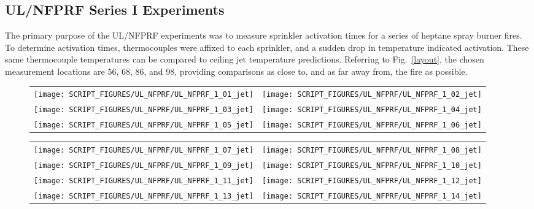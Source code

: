 \clearpage

\subsection{UL/NFPRF Series I Experiments}

The primary purpose of the UL/NFPRF experiments was to measure sprinkler activation times for a series of heptane spray burner fires. To determine activation times, thermocouples were affixed to each sprinkler, and a sudden drop in temperature indicated activation. These same thermocouple temperatures can be compared to ceiling jet temperature predictions. Referring to Fig.~\ref{layout}, the chosen measurement locations are 56, 68, 86, and 98, providing comparisons as close to, and as far away from, the fire as possible.


\begin{figure}[h!]
\begin{tabular*}{\textwidth}{l@{\extracolsep{\fill}}r}
\texttt{[image: SCRIPT\_FIGURES/UL\_NFPRF/UL\_NFPRF\_1\_01\_jet]} &
\texttt{[image: SCRIPT\_FIGURES/UL\_NFPRF/UL\_NFPRF\_1\_02\_jet]} \\
\texttt{[image: SCRIPT\_FIGURES/UL\_NFPRF/UL\_NFPRF\_1\_03\_jet]} &
\texttt{[image: SCRIPT\_FIGURES/UL\_NFPRF/UL\_NFPRF\_1\_04\_jet]} \\
\texttt{[image: SCRIPT\_FIGURES/UL\_NFPRF/UL\_NFPRF\_1\_05\_jet]} &
\texttt{[image: SCRIPT\_FIGURES/UL\_NFPRF/UL\_NFPRF\_1\_06\_jet]}
\end{tabular*}
\label{UL_NFPRF_jet_1}
\end{figure}

\newpage

\begin{figure}[p]
\begin{tabular*}{\textwidth}{l@{\extracolsep{\fill}}r}
\texttt{[image: SCRIPT\_FIGURES/UL\_NFPRF/UL\_NFPRF\_1\_07\_jet]} &
\texttt{[image: SCRIPT\_FIGURES/UL\_NFPRF/UL\_NFPRF\_1\_08\_jet]} \\
\texttt{[image: SCRIPT\_FIGURES/UL\_NFPRF/UL\_NFPRF\_1\_09\_jet]} &
\texttt{[image: SCRIPT\_FIGURES/UL\_NFPRF/UL\_NFPRF\_1\_10\_jet]} \\
\texttt{[image: SCRIPT\_FIGURES/UL\_NFPRF/UL\_NFPRF\_1\_11\_jet]} &
\texttt{[image: SCRIPT\_FIGURES/UL\_NFPRF/UL\_NFPRF\_1\_12\_jet]} \\
\texttt{[image: SCRIPT\_FIGURES/UL\_NFPRF/UL\_NFPRF\_1\_13\_jet]} &
\texttt{[image: SCRIPT\_FIGURES/UL\_NFPRF/UL\_NFPRF\_1\_14\_jet]}
\end{tabular*}
\label{UL_NFPRF_jet_2}
\end{figure}

